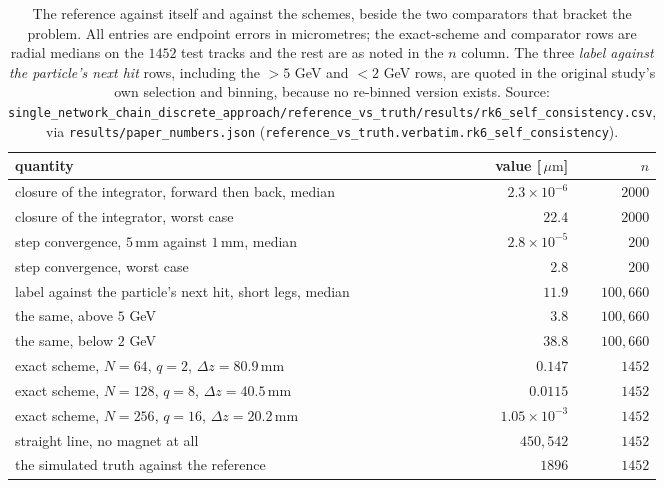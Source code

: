 \documentclass[11pt,a4paper]{article}
\newcommand{\um}{\ensuremath{\,\mu\mathrm{m}}}
\newcommand{\mm}{\ensuremath{\,\mathrm{mm}}}
\begin{document}
\begin{table}[tbp]
  \centering
  \caption{The reference against itself and against the schemes, beside the two
  comparators that bracket the problem. All entries are endpoint errors in
  micrometres; the exact-scheme and comparator rows are radial medians on the
  $1452$ test tracks and the rest are as noted in the $n$ column. The three
  \emph{label against the particle's next hit} rows, including the $>5$ GeV and
  $<2$ GeV rows, are quoted in the original study's own selection and binning,
  because no re-binned version exists. Source:
  \texttt{single\_network\_chain\_discrete\_approach/}\allowbreak\texttt{reference\_vs\_truth/results/rk6\_self\_consistency.csv},
  via \texttt{results/paper\_numbers.json}
  (\texttt{reference\_vs\_truth.verbatim.rk6\_self\_consistency}).}
  \label{tab:rk6self}
  \small
  \setlength{\tabcolsep}{6pt}
  \begin{tabular}{lrr}
    \toprule
    quantity & value [\um] & $n$ \\
    \midrule
    closure of the integrator, forward then back, median & $2.3\times 10^{-6}$ & $2000$ \\
    closure of the integrator, worst case                & $22.4$      & $2000$ \\
    step convergence, $5\mm$ against $1\mm$, median      & $2.8\times 10^{-5}$ & $200$ \\
    step convergence, worst case                         & $2.8$       & $200$ \\
    label against the particle's next hit, short legs, median & $11.9$ & $100{,}660$ \\
    the same, above $5$ GeV                              & $3.8$       & $100{,}660$ \\
    the same, below $2$ GeV                              & $38.8$      & $100{,}660$ \\
    exact scheme, $N = 64$, $q = 2$, $\Delta z = 80.9\mm$  & $0.147$     & $1452$ \\
    exact scheme, $N = 128$, $q = 8$, $\Delta z = 40.5\mm$ & $0.0115$    & $1452$ \\
    exact scheme, $N = 256$, $q = 16$, $\Delta z = 20.2\mm$& $1.05\times 10^{-3}$& $1452$ \\
    \midrule
    straight line, no magnet at all                      & $450{,}542$ & $1452$ \\
    the simulated truth against the reference            & $1896$      & $1452$ \\
    \bottomrule
  \end{tabular}
\end{table}
\end{document}
